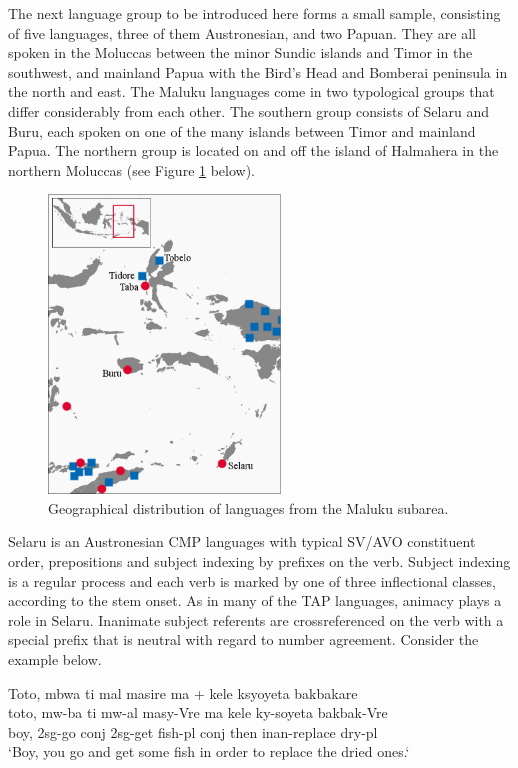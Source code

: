 The next language group to be introduced here forms a small sample, consisting of five languages, three of them Austronesian, and two Papuan. They are all spoken in the Moluccas between the minor Sundic islands and Timor in the southwest, and mainland Papua with the Bird's Head and Bomberai peninsula in the north and east. The Maluku languages come in two typological groups that differ considerably from each other. The southern group consists of Selaru and Buru, each spoken on one of the many islands between Timor and mainland Papua. The northern group is located on and off the island of Halmahera in the northern Moluccas (see Figure \ref{map:Mal} below).

\begin{figure}

\includegraphics[width=0.55\textwidth]{figures/Map_Maluku2.eps}
\caption{Geographical distribution of languages from the Maluku subarea.}\label{map:Mal}

\end{figure}

Selaru is an Austronesian CMP languages with typical SV/AVO constituent order, prepositions and subject indexing by prefixes on the verb. Subject indexing is a regular process and each verb is marked by one of three inflectional classes, according to the stem onset. As in many of the TAP languages, animacy plays a role in Selaru. Inanimate subject referents are crossreferenced on the verb with a special prefix that is neutral with regard to number agreement. Consider the example below.

\ea \label{selaru1}
\gll Toto, mbwa ti mal masire ma + kele ksyoyeta bakbakare \\
toto, mw-ba ti mw-al masy-Vre ma kele ky-soyeta bakbak-Vre \\
\glc boy, \acs{2}\acs{sg}-go \acs{conj} \acs{2}\acs{sg}-get fish-\acs{pl} \acs{conj} then \acs{inan}-replace dry-\acs{pl} \\
\glft `Boy, you go and get some fish in order to replace the dried ones.‘ \\ 
\endgl
\xe

